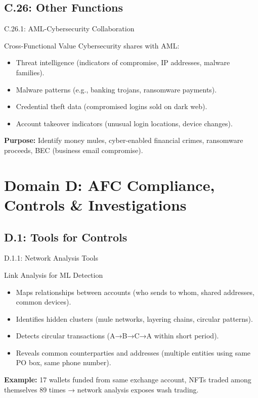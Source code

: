 \documentclass{beamer}
\begin{document}
	\subsection{C.26: Other Functions}
	
	\begin{frame}{C.26.1: AML-Cybersecurity Collaboration}
		\begin{block}{Cross-Functional Value}
			Cybersecurity shares with AML:
			\begin{itemize}
				\item Threat intelligence (indicators of compromise, IP addresses, malware families).
				\item Malware patterns (e.g., banking trojans, ransomware payments).
				\item Credential theft data (compromised logins sold on dark web).
				\item Account takeover indicators (unusual login locations, device changes).
			\end{itemize}
		\end{block}
		\textbf{Purpose:} Identify money mules, cyber-enabled financial crimes, ransomware proceeds, BEC (business email compromise).
	\end{frame}
	
	
	\section{Domain D: AFC Compliance, Controls \& Investigations}
	
	\subsection{D.1: Tools for Controls}
	
	\begin{frame}{D.1.1: Network Analysis Tools}
		\begin{block}{Link Analysis for ML Detection}
			\begin{itemize}
				\item Maps relationships between accounts (who sends to whom, shared addresses, common devices).
				\item Identifies hidden clusters (mule networks, layering chains, circular patterns).
				\item Detects circular transactions (A→B→C→A within short period).
				\item Reveals common counterparties and addresses (multiple entities using same PO box, same phone number).
			\end{itemize}
		\end{block}
		\textbf{Example:} 17 wallets funded from same exchange account, NFTs traded among themselves 89 times → network analysis exposes wash trading.
	\end{frame}
	
\end{document}

